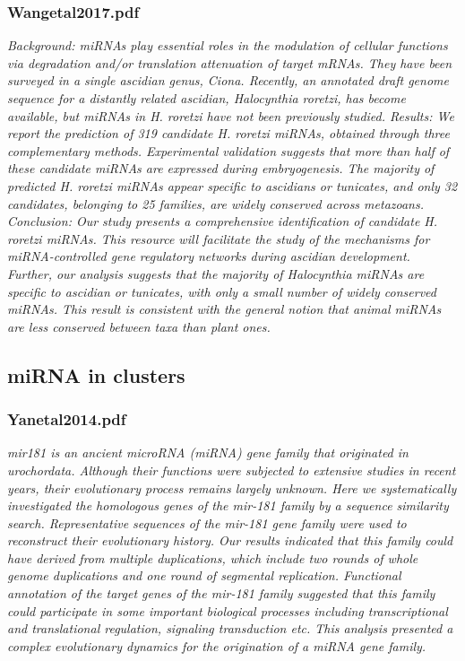 \documentclass[graybox]{svmult}
\begin{document}
\subsubsection{Wangetal2017.pdf}
\cite{Wang2017}
\textit{Background: miRNAs play essential roles in the modulation of cellular functions via degradation and/or translation
attenuation of target mRNAs. They have been surveyed in a single ascidian genus, Ciona. Recently, an annotated
draft genome sequence for a distantly related ascidian, Halocynthia roretzi, has become available, but miRNAs in
H. roretzi have not been previously studied.
Results: We report the prediction of 319 candidate H. roretzi miRNAs, obtained through three complementary
methods. Experimental validation suggests that more than half of these candidate miRNAs are expressed during
embryogenesis. The majority of predicted H. roretzi miRNAs appear specific to ascidians or tunicates, and only 32
candidates, belonging to 25 families, are widely conserved across metazoans.
Conclusion: Our study presents a comprehensive identification of candidate H. roretzi miRNAs. This resource
will facilitate the study of the mechanisms for miRNA-controlled gene regulatory networks during ascidian
development. Further, our analysis suggests that the majority of Halocynthia miRNAs are specific to ascidian
or tunicates, with only a small number of widely conserved miRNAs. This result is consistent with the general
notion that animal miRNAs are less conserved between taxa than plant ones.}



\subsection{miRNA in clusters}
\subsubsection{Yanetal2014.pdf}

\cite{Yang2014}
\textit{mir181 is an ancient microRNA (miRNA) gene family that originated in urochordata. Although their functions were subjected to extensive studies in recent years, their evolutionary process remains largely unknown. Here we systematically investigated the homologous genes of the mir-181 family by a sequence similarity search. Representative sequences of the mir-181 gene family were used to reconstruct their evolutionary history. Our results indicated that this family could have derived from multiple duplications, which include two rounds of whole genome duplications and one round of segmental replication. Functional annotation of the target genes of the mir-181 family suggested that this family could participate in some important biological processes including transcriptional and translational regulation, signaling transduction etc. This analysis presented a complex evolutionary dynamics for the origination of a miRNA gene family.}
\end{document}
